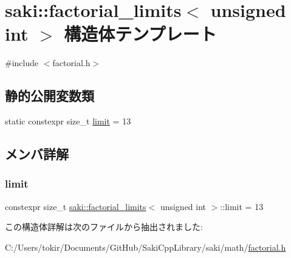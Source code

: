 \hypertarget{structsaki_1_1factorial__limits_3_01unsigned_01int_01_4}{}\section{saki\+:\+:factorial\+\_\+limits$<$ unsigned int $>$ 構造体テンプレート}
\label{structsaki_1_1factorial__limits_3_01unsigned_01int_01_4}


{\ttfamily \#include $<$factorial.\+h$>$}

\subsection*{静的公開変数類}
\begin{DoxyCompactItemize}
\item 
static constexpr size\+\_\+t \mbox{\hyperlink{structsaki_1_1factorial__limits_3_01unsigned_01int_01_4_a65b5da31abad56e34f563ec7d71e2421}{limit}} = 13
\end{DoxyCompactItemize}


\subsection{メンバ詳解}
\mbox{\label{structsaki_1_1factorial__limits_3_01unsigned_01int_01_4_a65b5da31abad56e34f563ec7d71e2421}} 
\subsubsection{\texorpdfstring{limit}{limit}}
{\footnotesize\ttfamily constexpr size\+\_\+t \mbox{\hyperlink{structsaki_1_1factorial__limits}{saki\+::factorial\+\_\+limits}}$<$ unsigned int $>$\+::limit = 13\hspace{0.3cm}{\ttfamily [static]}}



この構造体詳解は次のファイルから抽出されました\+:\begin{DoxyCompactItemize}
\item 
C\+:/\+Users/tokir/\+Documents/\+Git\+Hub/\+Saki\+Cpp\+Library/saki/math/\mbox{\hyperlink{factorial_8h}{factorial.\+h}}\end{DoxyCompactItemize}
